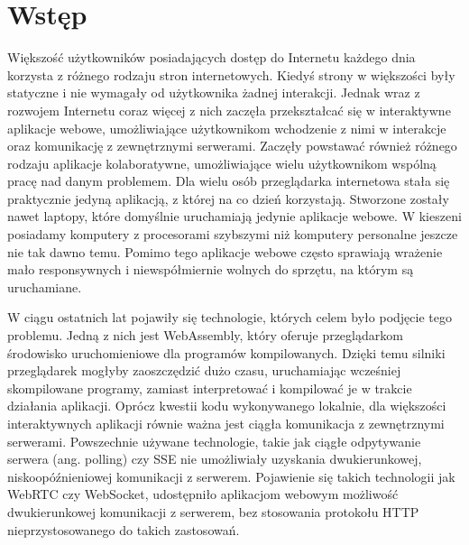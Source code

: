 \documentclass[language=polish,type=master]{aghmodern}
\author{Piotr Szczygieł}
\date{2022}
\begin{document}
\frontmatter
\maketitle

\setcounter{tocdepth}{1}
\tableofcontents

\mainmatter

\onehalfspacing

\chapter{Wstęp}
Większość użytkowników posiadających dostęp do Internetu każdego dnia korzysta z różnego rodzaju stron internetowych.
Kiedyś strony w większości były statyczne i nie wymagały od użytkownika żadnej interakcji.
Jednak wraz z rozwojem Internetu coraz więcej z nich zaczęła przekształcać się w interaktywne aplikacje webowe, umożliwiające użytkownikom wchodzenie z nimi w interakcje oraz komunikację z zewnętrznymi serwerami.
Zaczęły powstawać również różnego rodzaju aplikacje kolaboratywne, umożliwiające wielu użytkownikom wspólną pracę nad danym problemem.
Dla wielu osób przeglądarka internetowa stała się praktycznie jedyną aplikacją, z której na co dzień korzystają.
Stworzone zostały nawet laptopy\footnotemark{}, które domyślnie uruchamiają jedynie aplikacje webowe.
W kieszeni posiadamy komputery z procesorami szybszymi niż komputery personalne jeszcze nie tak dawno temu.
Pomimo tego aplikacje webowe często sprawiają wrażenie mało responsywnych i niewspółmiernie wolnych do sprzętu, na którym są uruchamiane.

W ciągu ostatnich lat pojawiły się technologie, których celem było podjęcie tego problemu.
Jedną z nich jest WebAssembly, który oferuje przeglądarkom środowisko uruchomieniowe dla programów kompilowanych.
Dzięki temu silniki przeglądarek mogłyby zaoszczędzić dużo czasu, uruchamiając wcześniej skompilowane programy, zamiast interpretować i kompilować je w trakcie działania aplikacji.
Oprócz kwestii kodu wykonywanego lokalnie, dla większości interaktywnych aplikacji równie ważna jest ciągła komunikacja z zewnętrznymi serwerami.
Powszechnie używane technologie, takie jak ciągłe odpytywanie serwera (ang. polling) czy SSE\footnotemark{} nie umożliwiały uzyskania dwukierunkowej, niskoopóźnieniowej komunikacji z serwerem.
Pojawienie się takich technologii jak WebRTC czy WebSocket, udostępniło aplikacjom webowym możliwość dwukierunkowej komunikacji z serwerem, bez stosowania protokołu HTTP nieprzystosowanego do takich zastosowań.
\end{document}
